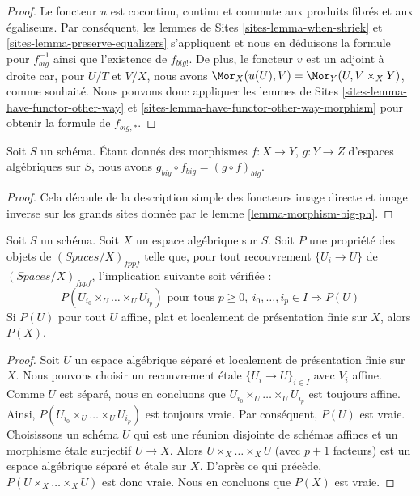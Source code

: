 \begin{proof}
Le foncteur $u$ est cocontinu, continu et commute aux produits fibrés
et aux égaliseurs. Par conséquent,
les lemmes de Sites \ref{sites-lemma-when-shriek} et
\ref{sites-lemma-preserve-equalizers}
s'appliquent et nous en déduisons la formule
pour $f_{big}^{-1}$ ainsi que l'existence de $f_{big!}$. De plus,
le foncteur $v$ est un adjoint à droite car, pour $U/T$ et $V/X$,
nous avons $\Mor_X(u(U), V) = \Mor_Y(U, V \times_X Y)$,
comme souhaité. Nous pouvons donc appliquer
les lemmes de Sites \ref{sites-lemma-have-functor-other-way} et
\ref{sites-lemma-have-functor-other-way-morphism} pour obtenir la
formule de $f_{big, *}$.
\end{proof}

\begin{lemma}
\label{lemma-composition-ph}
Soit $S$ un schéma. Étant donnés des morphismes $f : X \to Y$, $g : Y \to Z$
d'espaces algébriques sur $S$, nous avons
$g_{big} \circ f_{big} = (g \circ f)_{big}$.
\end{lemma}

\begin{proof}
Cela découle de la description simple des foncteurs image directe
et image inverse sur les grands sites donnée par le
lemme \ref{lemma-morphism-big-ph}.
\end{proof}

\begin{lemma}
\label{lemma-cech-enough}
Soit $S$ un schéma. Soit $X$ un espace algébrique sur $S$.
Soit $P$ une propriété des objets de $(\textit{Spaces}/X)_{fppf}$
telle que, pour tout recouvrement $\{U_i \to U\}$ de
$(\textit{Spaces}/X)_{fppf}$, l'implication suivante soit vérifiée :
$$
P(U_{i_0} \times_U \ldots \times_U U_{i_p})
\text{ pour tous }
p \geq 0,\ i_0, \ldots, i_p \in I
\Rightarrow P(U)
$$
Si $P(U)$ pour tout $U$ affine, plat et localement de présentation finie sur $X$,
alors $P(X)$.
\end{lemma}

\begin{proof}
Soit $U$ un espace algébrique séparé et localement de présentation finie sur $X$.
Nous pouvons choisir un recouvrement \'etale $\{U_i \to U\}_{i \in I}$ avec $V_i$
affine. Comme $U$ est séparé, nous en concluons que
$U_{i_0} \times_U \ldots \times_U U_{i_p}$ est toujours affine.
Ainsi, $P(U_{i_0} \times_U \ldots \times_U U_{i_p})$ est toujours vraie.
Par conséquent, $P(U)$ est vraie. Choisissons un schéma $U$ qui est une réunion disjointe de
schémas affines et un morphisme \'etale surjectif $U \to X$.
Alors $U \times_X \ldots \times_X U$ (avec $p + 1$ facteurs)
est un espace algébrique séparé
et \'etale sur $X$. D'après ce qui précède, $P(U \times_X \ldots \times_X U)$ est donc vraie.
Nous en concluons que $P(X)$ est vraie.
\end{proof}












